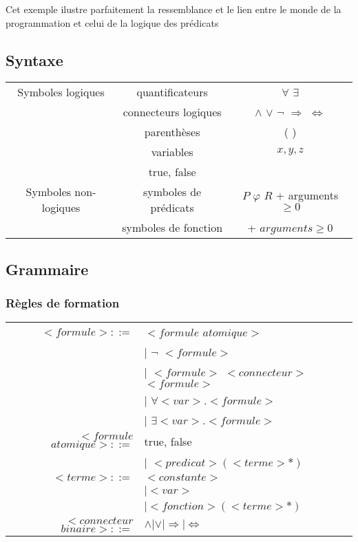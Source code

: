 Cet exemple ilustre parfaitement la ressemblance et le lien entre le monde de la programmation et celui de la logique des prédicats

\subsection{Syntaxe}

\begin{tabular}{|c|c|c|}
	\hline
	Symboles logiques & quantificateurs & $\forall$ $\exists$ \\
	                  & connecteurs logiques & $\wedge$ $\vee$ $\neg$ $\Rightarrow$ $\Leftrightarrow$ \\
	                  & parenthèses & ( ) \\
	                  & variables & $x, y, z$ \\
	                  & true, false & \\
	\hline
	Symboles non-logiques & symboles de prédicats & $P$ $\varphi$ $R$ + arguments $\geq 0$ \\
						  & symboles de fonction & + $arguments \geq 0 $\\
	\hline
\end{tabular}

\subsection{Grammaire}
\subsubsection{Règles de formation}
\begin{tabular}{rl}
$<formule>::=$ 	  &	$<formule$ $atomique>$ \\
				  & $\vert$ $\neg$ $<formule>$ \\
				  & $\vert$ $<formule>$ $<connecteur>$ $<formule>$ \\
				  & $\vert$ $\forall <var>.<formule>$ \\
				  & $\vert$ $\exists <var>.<formule>$ \\
$<formule$ $atomique>::=$ 
				  & true, false \\
				  & $\vert$ $<predicat>(<terme>*)$ \\
$<terme>::=$	  & $<constante>$ \\
				  & $\vert <var>$ \\
				  & $\vert <fonction>(<terme>*)$ \\
$<connecteur$ $binaire>::=$ 
				  & $\wedge \vert \vee \vert \Rightarrow \vert \Leftrightarrow$ \\

\end{tabular}

